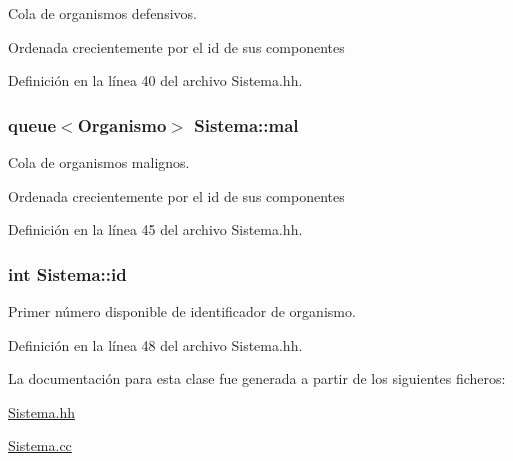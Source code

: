 Cola de organismos defensivos. 

Ordenada crecientemente por el id de sus componentes 

Definición en la línea 40 del archivo Sistema.\+hh.

\subsubsection[{\texorpdfstring{mal}{mal}}]{\setlength{\rightskip}{0pt plus 5cm}queue$<${\bf Organismo}$>$ Sistema\+::mal\hspace{0.3cm}{\ttfamily [private]}}\hypertarget{class_sistema_a11fa1af3dde26025dd10b3ac103f426e}{}\label{class_sistema_a11fa1af3dde26025dd10b3ac103f426e}


Cola de organismos malignos. 

Ordenada crecientemente por el id de sus componentes 

Definición en la línea 45 del archivo Sistema.\+hh.

\subsubsection[{\texorpdfstring{id}{id}}]{\setlength{\rightskip}{0pt plus 5cm}int Sistema\+::id\hspace{0.3cm}{\ttfamily [private]}}\hypertarget{class_sistema_a69ba5e2cce55afc2a47d899a1100a42a}{}\label{class_sistema_a69ba5e2cce55afc2a47d899a1100a42a}


Primer número disponible de identificador de organismo. 



Definición en la línea 48 del archivo Sistema.\+hh.



La documentación para esta clase fue generada a partir de los siguientes ficheros\+:\begin{DoxyCompactItemize}
\item 
\hyperlink{_sistema_8hh}{Sistema.\+hh}\item 
\hyperlink{_sistema_8cc}{Sistema.\+cc}\end{DoxyCompactItemize}
